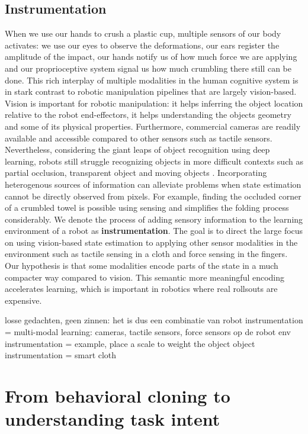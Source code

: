 \documentclass[\home/main.tex]{subfiles}
\begin{document}
\subsection{Instrumentation}
When we use our hands to crush a plastic cup, multiple sensors of our body activates: we use our eyes to observe the deformations, our ears register the amplitude of the impact, our hands notify us of how much force we are applying and our proprioceptive system signal us how much crumbling there still can be done. This rich interplay of multiple modalities in the human cognitive system is in stark contrast to robotic manipulation pipelines that are largely vision-based.  Vision is important for robotic manipulation: it helps inferring the object location relative to the robot end-effectors, it helps understanding the objects geometry and some of its physical properties. Furthermore, commercial cameras are readily available and accessible compared to other sensors such as tactile sensors. Nevertheless, considering the giant leaps of object recognition using deep learning, robots still struggle recognizing objects in more difficult contexts such as partial occlusion, transparent object and moving objects \autocite{Guo2014,sajjan2019cleargrasp,Ojha2015}. 
Incorporating heterogenous sources of information can alleviate problems when state estimation cannot be directly observed from pixels. For example, finding the occluded corner of a crumbled towel is possible using sensing and simplifies the folding process considerably. 
We denote the process of adding sensory information to the learning environment of a robot as \textbf{instrumentation}. The goal is to direct the large focus on using vision-based state estimation to applying other sensor modalities in the environment such as tactile sensing in a cloth and force sensing in the fingers. Our hypothesis is that some modalities encode parts of the state in a much compacter way compared to vision. This semantic more meaningful encoding accelerates learning, which is important in robotics where real rollsouts are expensive. 

losse gedachten, geen zinnen:
    het is dus een combinatie van 
        robot instrumentation = multi-modal learning: cameras, tactile sensors, force sensors op de robot 
        env instrumentation = example, place a scale to weight the object 
        object instrumentation = smart cloth 

\section{From behavioral cloning to understanding task intent}
\end{document}
